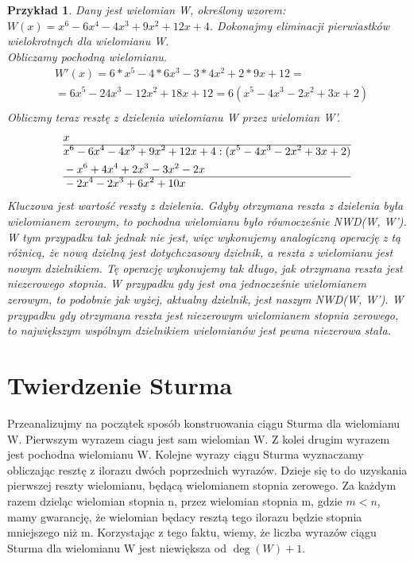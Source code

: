 \documentclass[twoside,a4paper]{book}
\newtheorem{example}{Przykład}
\begin{document}
\begin{example}
	Dany jest wielomian W, określony wzorem: $W(x)=x^6-6x^4-4x^3+9x^2+12x+4$. Dokonajmy eliminacji pierwiastków wielokrotnych dla wielomianu W. \\
	Obliczamy pochodną wielomianu.
	\begin{equation}
	\begin{split}
	&W'(x)=6*x^5-4*6x^3-3*4x^2+2*9x+12=\\
	&=6x^5-24x^3-12x^2+18x+12=6(x^5-4x^3-2x^2+3x+2)\\
	\end{split}
	\end{equation}
	Obliczmy teraz resztę z dzielenia wielomianu W przez wielomian W'.
	\begin{equation}
	\begin{split}
	&x\\\hline
	&x^6-6x^4-4x^3+9x^2+12x+4 : (x^5-4x^3-2x^2+3x+2) \\
	&-x^6+4x^4+2x^3-3x^2-2x \\\hline
	&-2x^4-2x^3+6x^2+10x \\
	\end{split}
	\end{equation}
	Kluczowa jest wartość reszty z dzielenia. Gdyby otrzymana reszta z dzielenia była wielomianem zerowym, to pochodna wielomianu było równocześnie NWD(W, W'). W tym przypadku tak jednak nie jest, więc wykonujemy analogiczną operację z tą różnicą, że nową dzielną jest dotychczasowy dzielnik, a reszta z wielomianu jest nowym dzielnikiem. Tę operację wykonujemy tak długo, jak otrzymana reszta jest niezerowego stopnia. W przypadku gdy jest ona jednocześnie wielomianem zerowym, to podobnie jak wyżej, aktualny dzielnik, jest naszym NWD(W, W'). W przypadku gdy otrzymana reszta jest niezerowym wielomianem stopnia zerowego, to największym wspólnym dzielnikiem wielomianów jest pewna niezerowa stała.
\end{example}

\section{Twierdzenie Sturma}

Przeanalizujmy na początek sposób konstruowania ciągu Sturma dla wielomianu W. Pierwszym wyrazem ciagu jest sam wielomian W. Z kolei drugim wyrazem jest pochodna wielomianu W. Kolejne wyrazy ciągu Sturma wyznaczamy obliczając resztę z ilorazu dwóch poprzednich wyrazów. Dzieje się to do uzyskania pierwszej reszty wielomianu, będącą wielomianem stopnia zerowego. Za każdym razem dzieląc wielomian stopnia n, przez wielomian stopnia m, gdzie $m<n$, mamy gwarancję, że wielomian będacy resztą tego ilorazu będzie stopnia mniejszego niż m. Korzystając z tego faktu, wiemy, że liczba wyrazów ciągu Sturma dla wielomianu W jest niewiększa od $\deg(W)+1$.
\end{document}
